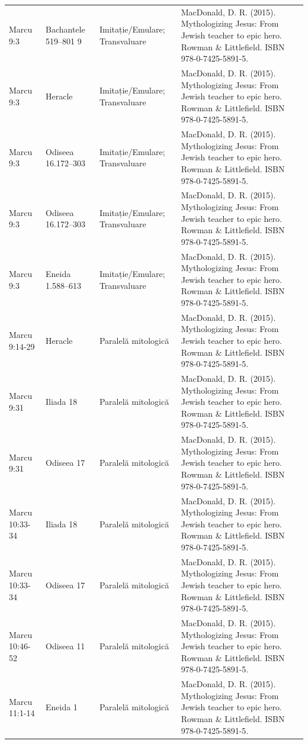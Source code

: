 \documentclass[12pt,a4paper,twoside,openany]{book}
\begin{document}
\begin{longtable}{L{1.4cm}L{1.7cm}L{3.1cm}L{8.4cm}}
Marcu 9:3 & Bachantele 519–801 9 & Imitație/Emulare; Transvaluare & MacDonald, D. R. (2015). Mythologizing Jesus: From Jewish teacher to epic hero. Rowman \& Littlefield. ISBN 978-0-7425-5891-5. \\
Marcu 9:3 & Heracle & Imitație/Emulare; Transvaluare & MacDonald, D. R. (2015). Mythologizing Jesus: From Jewish teacher to epic hero. Rowman \& Littlefield. ISBN 978-0-7425-5891-5. \\
Marcu 9:3 & Odiseea 16.172–303 & Imitație/Emulare; Transvaluare & MacDonald, D. R. (2015). Mythologizing Jesus: From Jewish teacher to epic hero. Rowman \& Littlefield. ISBN 978-0-7425-5891-5. \\
Marcu 9:3 & Odiseea 16.172–303 & Imitație/Emulare; Transvaluare & MacDonald, D. R. (2015). Mythologizing Jesus: From Jewish teacher to epic hero. Rowman \& Littlefield. ISBN 978-0-7425-5891-5. \\
Marcu 9:3 & Eneida 1.588–613 & Imitație/Emulare; Transvaluare & MacDonald, D. R. (2015). Mythologizing Jesus: From Jewish teacher to epic hero. Rowman \& Littlefield. ISBN 978-0-7425-5891-5. \\
Marcu 9:14-29 & Heracle & Paralelă mitologică & MacDonald, D. R. (2015). Mythologizing Jesus: From Jewish teacher to epic hero. Rowman \& Littlefield. ISBN 978-0-7425-5891-5. \\
Marcu 9:31 & Iliada 18 & Paralelă mitologică & MacDonald, D. R. (2015). Mythologizing Jesus: From Jewish teacher to epic hero. Rowman \& Littlefield. ISBN 978-0-7425-5891-5. \\
Marcu 9:31 & Odiseea 17 & Paralelă mitologică & MacDonald, D. R. (2015). Mythologizing Jesus: From Jewish teacher to epic hero. Rowman \& Littlefield. ISBN 978-0-7425-5891-5. \\
Marcu 10:33-34 & Iliada 18 & Paralelă mitologică & MacDonald, D. R. (2015). Mythologizing Jesus: From Jewish teacher to epic hero. Rowman \& Littlefield. ISBN 978-0-7425-5891-5. \\
Marcu 10:33-34 & Odiseea 17 & Paralelă mitologică & MacDonald, D. R. (2015). Mythologizing Jesus: From Jewish teacher to epic hero. Rowman \& Littlefield. ISBN 978-0-7425-5891-5. \\
Marcu 10:46-52 & Odiseea 11 & Paralelă mitologică & MacDonald, D. R. (2015). Mythologizing Jesus: From Jewish teacher to epic hero. Rowman \& Littlefield. ISBN 978-0-7425-5891-5. \\
Marcu 11:1-14 & Eneida 1 & Paralelă mitologică & MacDonald, D. R. (2015). Mythologizing Jesus: From Jewish teacher to epic hero. Rowman \& Littlefield. ISBN 978-0-7425-5891-5. \\

\end{longtable}
\end{document}
